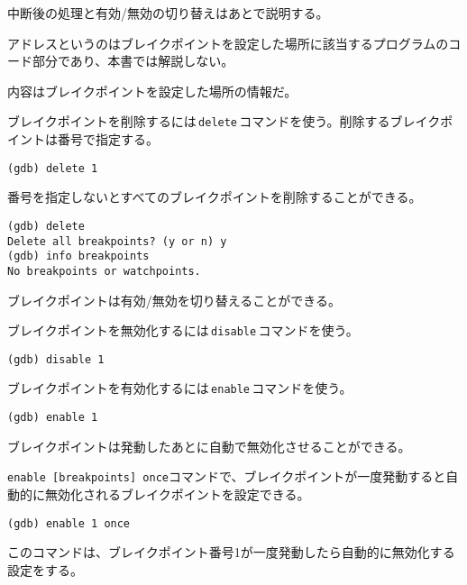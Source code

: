 中断後の処理と有効/無効の切り替えはあとで説明する。

アドレスというのはブレイクポイントを設定した場所に該当するプログラムのコード部分であり、本書では解説しない。

内容はブレイクポイントを設定した場所の情報だ。


ブレイクポイントを削除するには\,\texttt{delete}\,コマンドを使う。削除するブレイクポイントは番号で指定する。

\begin{lstlisting}[style=terminal]
(gdb) delete 1
\end{lstlisting}

番号を指定しないとすべてのブレイクポイントを削除することができる。

\begin{lstlisting}[style=terminal]
(gdb) delete
Delete all breakpoints? (y or n) y
(gdb) info breakpoints
No breakpoints or watchpoints.
\end{lstlisting}


ブレイクポイントは有効/無効を切り替えることができる。

ブレイクポイントを無効化するには\,\texttt{disable}\,コマンドを使う。

\begin{lstlisting}[style=terminal]
(gdb) disable 1
\end{lstlisting}

ブレイクポイントを有効化するには\,\texttt{enable}\,コマンドを使う。

\begin{lstlisting}[style=terminal]
(gdb) enable 1
\end{lstlisting}

ブレイクポイントは発動したあとに自動で無効化させることができる。

\texttt{enable [breakpoints] once}コマンドで、ブレイクポイントが一度発動すると自動的に無効化されるブレイクポイントを設定できる。

\begin{lstlisting}[style=terminal]
(gdb) enable 1 once
\end{lstlisting}

このコマンドは、ブレイクポイント番号1が一度発動したら自動的に無効化する設定をする。

